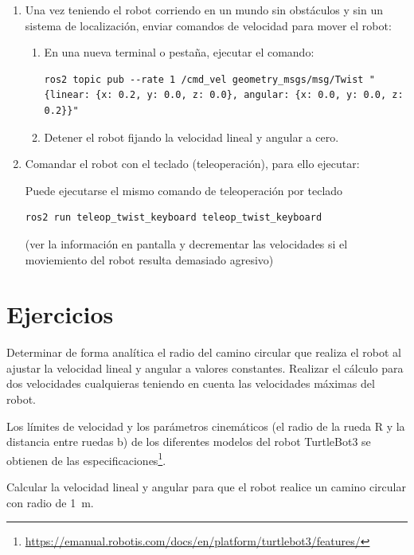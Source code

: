 \documentclass[tp]{lcc}
\begin{document}
\begin{enumerate}
	\item Una vez teniendo el robot corriendo en un mundo sin obstáculos y sin un sistema de localización, enviar comandos de velocidad para mover el robot:

	\begin{enumerate}
	\item En una nueva terminal o pestaña, ejecutar el comando:

\begin{lstlisting}[style=bash] 
ros2 topic pub --rate 1 /cmd_vel geometry_msgs/msg/Twist "{linear: {x: 0.2, y: 0.0, z: 0.0}, angular: {x: 0.0, y: 0.0, z: 0.2}}"
\end{lstlisting}

	\item Detener el robot fijando la velocidad lineal y angular a cero.
	\end{enumerate}

\item Comandar el robot con el teclado (teleoperación), para ello ejecutar:

Puede ejecutarse el mismo comando de teleoperación por teclado
\begin{lstlisting}[style=bash] 
ros2 run teleop_twist_keyboard teleop_twist_keyboard
\end{lstlisting}
(ver la información en pantalla y decrementar las velocidades si el moviemiento del robot
resulta demasiado agresivo)
\end{enumerate}


\section{Ejercicios}

\ejercicio  Determinar de forma analítica el radio del camino circular que realiza el robot al ajustar la velocidad lineal y angular a valores constantes. Realizar el cálculo para dos velocidades cualquieras teniendo en cuenta las velocidades máximas del robot.

\begin{nota}
	Los límites de velocidad y los parámetros cinemáticos (el radio de la rueda R y la distancia entre ruedas b) de los diferentes modelos del robot TurtleBot3 se obtienen de las especificaciones\footnote{\url{https://emanual.robotis.com/docs/en/platform/turtlebot3/features/}}.
\end{nota}

\ejercicio  Calcular la velocidad lineal y angular para que el robot realice un camino circular con radio de \SI{1}{\meter}.
\end{document}
